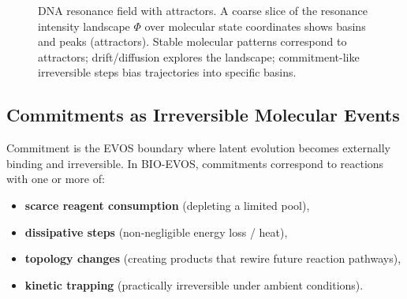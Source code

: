 \documentclass[11pt]{article}
\begin{document}
\begin{figure}[t]
\caption{DNA resonance field with attractors. A coarse slice of the resonance intensity landscape $\Phi$ over molecular state coordinates shows basins and peaks (attractors). Stable molecular patterns correspond to attractors; drift/diffusion explores the landscape; commitment-like irreversible steps bias trajectories into specific basins.}
\label{fig:dna-resonance-attractors}
\end{figure}

\subsection{Commitments as Irreversible Molecular Events}
\label{sec:molecular-commitments}

Commitment is the EVOS boundary where latent evolution becomes externally binding and
irreversible. In BIO-EVOS, commitments correspond to reactions with one or more of:

\begin{itemize}
  \item \textbf{scarce reagent consumption} (depleting a limited pool),
  \item \textbf{dissipative steps} (non-negligible energy loss / heat),
  \item \textbf{topology changes} (creating products that rewire future reaction pathways),
  \item \textbf{kinetic trapping} (practically irreversible under ambient conditions).
\end{itemize}
\end{document}
